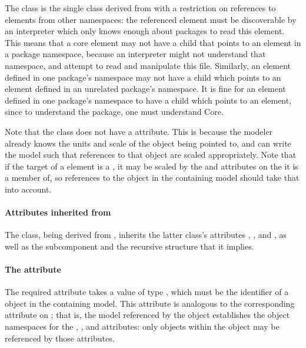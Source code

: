 The \ReplacedBy class is the single class derived from \SBaseRef with a
restriction on references to elements from other namespaces:  the referenced
element must be discoverable by an interpreter which only knows enough about
packages to read this element.  This means that a core element may not have
a \ReplacedBy child that points to an element in a package namespace, because
an interpreter might not understand that namespace, and attempt to read
and manipulate this file.  Similarly, an element defined in one package's
namespace may not have a \ReplacedBy child which points to an element 
defined in an unrelated package's namespace.  It is fine for an element 
defined in one package's namespace to have a \ReplacedBy child which points 
to an \sbmlthreecore element, since to understand the package, one must understand Core.

Note that the \ReplacedBy class does not have a 
attribute.  This is because the modeler already knows the units
and scale of the object being pointed to, and can write the model such that 
references to that object are scaled appropriately.  Note that if the target
of a \ReplacedBy element is a \Reaction, it may be scaled by the
 and  attributes
on the \Submodel it is a member of, so references to the object in the
containing model should take that into account.

\paragraph{Attributes inherited from }

The \ReplacedBy class, being derived from \SBaseRef, inherits the latter
class's attributes , ,  and
, as well as the subcomponent  and the
recursive structure that it implies.  


\paragraph{The \fixttspace{} attribute}
\label{replacedby-submodelref}

The required attribute  takes a value of type
, which must be the identifier of a \Submodel object in
the containing model.  This attribute is analogous to the corresponding
attribute on \ReplacedElement; that is, the model referenced by the
\Submodel object establishes the object namespaces for the
, ,  and 
attributes: only objects within the \Model object may be referenced by
those attributes.


